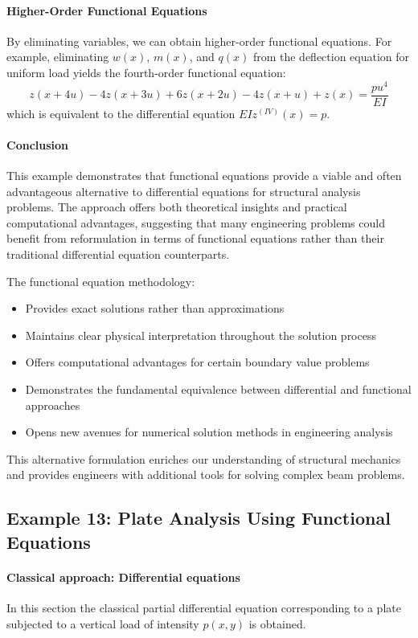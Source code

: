 \paragraph{Higher-Order Functional Equations}
By eliminating variables, we can obtain higher-order functional equations. For example, eliminating $w(x)$, $m(x)$, and $q(x)$ from the deflection equation for uniform load yields the fourth-order functional equation:
\begin{equation}
z(x + 4u) - 4z(x + 3u) + 6z(x + 2u) - 4z(x + u) + z(x) = \frac{pu^4}{EI}
\end{equation}
which is equivalent to the differential equation $EIz^{(IV)}(x) = p$.

\paragraph{Conclusion}
This example demonstrates that functional equations provide a viable and often advantageous alternative to differential equations for structural analysis problems. The approach offers both theoretical insights and practical computational advantages, suggesting that many engineering problems could benefit from reformulation in terms of functional equations rather than their traditional differential equation counterparts.

The functional equation methodology:
\begin{itemize}
\item Provides exact solutions rather than approximations
\item Maintains clear physical interpretation throughout the solution process
\item Offers computational advantages for certain boundary value problems
\item Demonstrates the fundamental equivalence between differential and functional approaches
\item Opens new avenues for numerical solution methods in engineering analysis
\end{itemize}

This alternative formulation enriches our understanding of structural mechanics and provides engineers with additional tools for solving complex beam problems.

\subsection{Example 13: Plate Analysis Using Functional Equations}
\paragraph{Classical approach: Differential equations}
In this section the classical partial differential equation corresponding to a plate subjected to a vertical load of intensity $p(x,y)$ is obtained.

